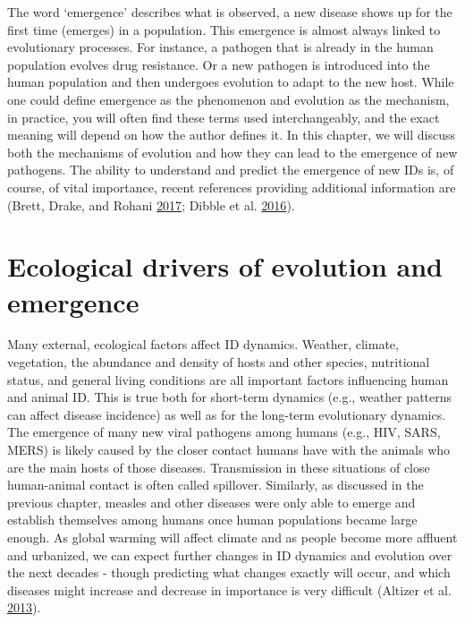 \documentclass[]{book}
\theoremstyle{definition}
\theoremstyle{definition}
\theoremstyle{definition}
\theoremstyle{remark}
\begin{document}
The word `emergence' describes what is observed, a new disease shows up
for the first time (emerges) in a population. This emergence is almost
always linked to evolutionary processes. For instance, a pathogen that
is already in the human population evolves drug resistance. Or a new
pathogen is introduced into the human population and then undergoes
evolution to adapt to the new host. While one could define emergence as
the phenomenon and evolution as the mechanism, in practice, you will
often find these terms used interchangeably, and the exact meaning will
depend on how the author defines it. In this chapter, we will discuss
both the mechanisms of evolution and how they can lead to the emergence
of new pathogens. The ability to understand and predict the emergence of
new IDs is, of course, of vital importance, recent references providing
additional information are (Brett, Drake, and Rohani
\protect\hyperlink{ref-brett17}{2017}; Dibble et al.
\protect\hyperlink{ref-dibble16}{2016}).

\section{Ecological drivers of evolution and
emergence}\label{ecological-drivers-of-evolution-and-emergence}

Many external, ecological factors affect ID dynamics. Weather, climate,
vegetation, the abundance and density of hosts and other species,
nutritional status, and general living conditions are all important
factors influencing human and animal ID. This is true both for
short-term dynamics (e.g., weather patterns can affect disease
incidence) as well as for the long-term evolutionary dynamics. The
emergence of many new viral pathogens among humans (e.g., HIV, SARS,
MERS) is likely caused by the closer contact humans have with the
animals who are the main hosts of those diseases. Transmission in these
situations of close human-animal contact is often called spillover.
Similarly, as discussed in the previous chapter, measles and other
diseases were only able to emerge and establish themselves among humans
once human populations became large enough. As global warming will
affect climate and as people become more affluent and urbanized, we can
expect further changes in ID dynamics and evolution over the next
decades - though predicting what changes exactly will occur, and which
diseases might increase and decrease in importance is very difficult
(Altizer et al. \protect\hyperlink{ref-altizer13}{2013}).
\end{document}
